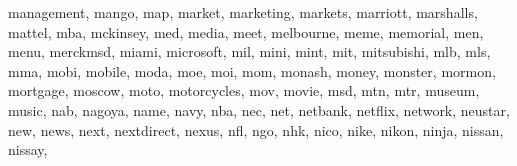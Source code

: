 \documentclass[letterpaper,10pt,english]{sphinxmanual}
\begin{document}
\begin{fulllineitems}
\begin{fulllineitems}
\textquotesingle{}management\textquotesingle{}, \textquotesingle{}mango\textquotesingle{}, \textquotesingle{}map\textquotesingle{}, \textquotesingle{}market\textquotesingle{}, \textquotesingle{}marketing\textquotesingle{}, \textquotesingle{}markets\textquotesingle{}, \textquotesingle{}marriott\textquotesingle{}, \textquotesingle{}marshalls\textquotesingle{}, \textquotesingle{}mattel\textquotesingle{}, \textquotesingle{}mba\textquotesingle{}, \textquotesingle{}mckinsey\textquotesingle{}, \textquotesingle{}med\textquotesingle{}, \textquotesingle{}media\textquotesingle{}, \textquotesingle{}meet\textquotesingle{}, \textquotesingle{}melbourne\textquotesingle{}, \textquotesingle{}meme\textquotesingle{}, \textquotesingle{}memorial\textquotesingle{}, \textquotesingle{}men\textquotesingle{}, \textquotesingle{}menu\textquotesingle{}, \textquotesingle{}merckmsd\textquotesingle{}, \textquotesingle{}miami\textquotesingle{}, \textquotesingle{}microsoft\textquotesingle{}, \textquotesingle{}mil\textquotesingle{}, \textquotesingle{}mini\textquotesingle{}, \textquotesingle{}mint\textquotesingle{}, \textquotesingle{}mit\textquotesingle{}, \textquotesingle{}mitsubishi\textquotesingle{}, \textquotesingle{}mlb\textquotesingle{}, \textquotesingle{}mls\textquotesingle{}, \textquotesingle{}mma\textquotesingle{}, \textquotesingle{}mobi\textquotesingle{}, \textquotesingle{}mobile\textquotesingle{}, \textquotesingle{}moda\textquotesingle{}, \textquotesingle{}moe\textquotesingle{}, \textquotesingle{}moi\textquotesingle{}, \textquotesingle{}mom\textquotesingle{}, \textquotesingle{}monash\textquotesingle{}, \textquotesingle{}money\textquotesingle{}, \textquotesingle{}monster\textquotesingle{}, \textquotesingle{}mormon\textquotesingle{}, \textquotesingle{}mortgage\textquotesingle{}, \textquotesingle{}moscow\textquotesingle{}, \textquotesingle{}moto\textquotesingle{}, \textquotesingle{}motorcycles\textquotesingle{}, \textquotesingle{}mov\textquotesingle{}, \textquotesingle{}movie\textquotesingle{}, \textquotesingle{}msd\textquotesingle{}, \textquotesingle{}mtn\textquotesingle{}, \textquotesingle{}mtr\textquotesingle{}, \textquotesingle{}museum\textquotesingle{}, \textquotesingle{}music\textquotesingle{}, \textquotesingle{}nab\textquotesingle{}, \textquotesingle{}nagoya\textquotesingle{}, \textquotesingle{}name\textquotesingle{}, \textquotesingle{}navy\textquotesingle{}, \textquotesingle{}nba\textquotesingle{}, \textquotesingle{}nec\textquotesingle{}, \textquotesingle{}net\textquotesingle{}, \textquotesingle{}netbank\textquotesingle{}, \textquotesingle{}netflix\textquotesingle{}, \textquotesingle{}network\textquotesingle{}, \textquotesingle{}neustar\textquotesingle{}, \textquotesingle{}new\textquotesingle{}, \textquotesingle{}news\textquotesingle{}, \textquotesingle{}next\textquotesingle{}, \textquotesingle{}nextdirect\textquotesingle{}, \textquotesingle{}nexus\textquotesingle{}, \textquotesingle{}nfl\textquotesingle{}, \textquotesingle{}ngo\textquotesingle{}, \textquotesingle{}nhk\textquotesingle{}, \textquotesingle{}nico\textquotesingle{}, \textquotesingle{}nike\textquotesingle{}, \textquotesingle{}nikon\textquotesingle{}, \textquotesingle{}ninja\textquotesingle{}, \textquotesingle{}nissan\textquotesingle{}, \textquotesingle{}nissay\textquotesingle{}, 
\end{fulllineitems}
\end{fulllineitems}
\end{document}
